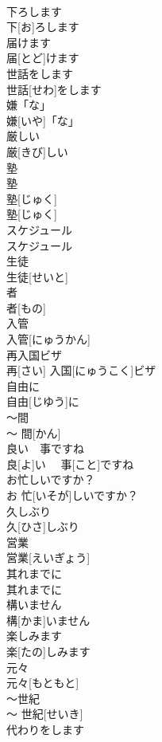 \documentclass[8pt]{extreport}
\begin{document}
\begin{CJK}{UTF8}{min}
\\	下ろします	
\\	下[お]ろします	
\\	届けます	
\\	届[とど]けます	
\\	世話をします	
\\	世話[せわ]をします	
\\	嫌「な」	
\\	嫌[いや]「な」	
\\	厳しい	
\\	厳[きび]しい	
\\	塾
\\	塾
\\	塾[じゅく]
\\	塾[じゅく]
\\	スケジュール	
\\	スケジュール	
\\	生徒	
\\	生徒[せいと]	
\\	者	
\\	者[もの]	
\\	入管	
\\	入管[にゅうかん]	
\\	再入国ビザ	
\\	再[さい] 入国[にゅうこく]ビザ	
\\	自由に	
\\	自由[じゆう]に	
\\	〜間	
\\	〜 間[かん]	
\\	良い　事ですね	
\\	良[よ]い　 事[こと]ですね	
\\	お忙しいですか？	
\\	お 忙[いそが]しいですか？	
\\	久しぶり	
\\	久[ひさ]しぶり	
\\	営業	
\\	営業[えいぎょう]	
\\	其れまでに	
\\	其れまでに	
\\	構いません	
\\	構[かま]いません	
\\	楽しみます	
\\	楽[たの]しみます	
\\	元々	
\\	元々[もともと]	
\\	〜世紀	
\\	〜 世紀[せいき]	
\\	代わりをします	

\end{CJK}
\end{document}
